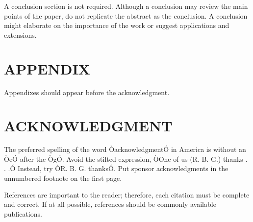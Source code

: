 \documentclass[letterpaper, 10 pt, conference]{ieeeconf}  %
\begin{document}
A conclusion section is not required. Although a conclusion may review the main points of the paper, do not replicate the abstract as the conclusion. A conclusion might elaborate on the importance of the work or suggest applications and extensions. 


\addtolength{\textheight}{-12cm}   %







\section*{APPENDIX}

Appendixes should appear before the acknowledgment.

\section*{ACKNOWLEDGMENT}

The preferred spelling of the word ÒacknowledgmentÓ in America is without an ÒeÓ after the ÒgÓ. Avoid the stilted expression, ÒOne of us (R. B. G.) thanks . . .Ó  Instead, try ÒR. B. G. thanksÓ. Put sponsor acknowledgments in the unnumbered footnote on the first page.




References are important to the reader; therefore, each citation must be complete and correct. If at all possible, references should be commonly available publications.




\end{document}
